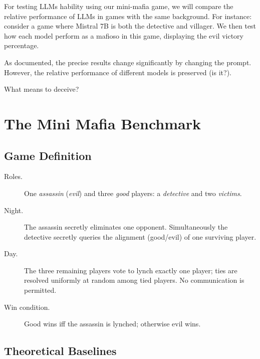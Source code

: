 \documentclass{article}
\begin{document}
For testing LLMs hability using our mini-mafia game, we will compare the relative performance of LLMs in games with the same background. For instance: consider a game where Mistral 7B is both the detective and villager. We then test how each model perform as a mafioso in this game, displaying the evil victory percentage.

As documented, the precise results change significantly by changing the prompt. However, the relative performance of different models is preserved (is it?). 



What means to deceive? 



\section{The Mini Mafia Benchmark}



\subsection{Game Definition}

\begin{description}
  \item[Roles.] One \emph{assassin} (\emph{evil}) and three \emph{good} players: a \emph{detective} and two \emph{victims}.
  \item[Night.] The assassin secretly eliminates one opponent.  Simultaneously the detective secretly queries the alignment (good/evil) of one surviving player.
  \item[Day.] The three remaining players vote to lynch exactly one player; ties are resolved uniformly at random among tied players.  No communication is permitted.
  \item[Win condition.]  Good wins iff the assassin is lynched; otherwise evil wins.
\end{description}


\subsection{Theoretical Baselines}
\end{document}
